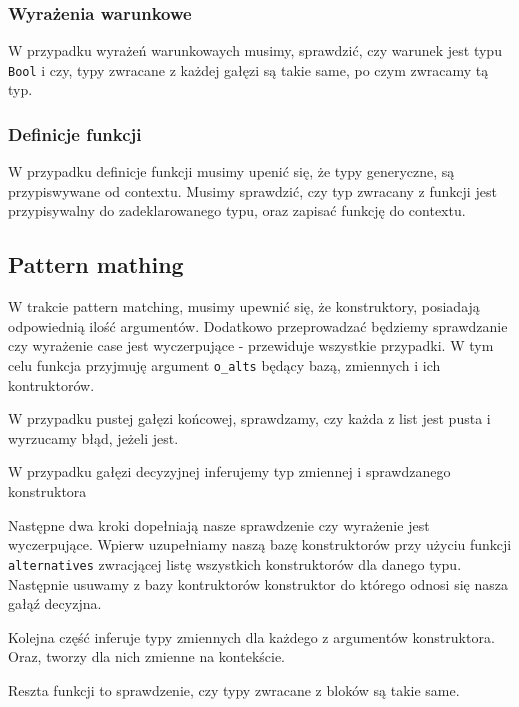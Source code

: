 \documentclass{article}
\begin{document}
\subsubsection{Wyrażenia warunkowe}
W przypadku wyrażeń warunkowaych musimy, sprawdzić, czy warunek jest typu \lstinline{Bool} i czy, typy zwracane z każdej gałęzi są takie same, po czym zwracamy tą typ.


\subsubsection{Definicje funkcji}
W przypadku definicje funkcji musimy upenić się, że typy generyczne, są przypiswywane od contextu. Musimy sprawdzić, czy typ zwracany z funkcji jest przypisywalny do zadeklarowanego typu, oraz zapisać funkcję do contextu.


\subsection{Pattern mathing}
W trakcie pattern matching, musimy upewnić się, że konstruktory, posiadają odpowiednią ilość argumentów. Dodatkowo przeprowadzać będziemy sprawdzanie czy wyrażenie case jest wyczerpujące - przewiduje wszystkie przypadki. W tym celu funkcja przyjmuję argument \lstinline{o_alts} będący bazą, zmiennych i ich kontruktorów.

W przypadku pustej gałęzi końcowej, sprawdzamy, czy każda z list jest pusta i wyrzucamy błąd, jeżeli jest.


W przypadku gałęzi decyzyjnej inferujemy typ zmiennej i sprawdzanego konstruktora

Następne dwa kroki dopełniają nasze sprawdzenie czy wyrażenie jest wyczerpujące. Wpierw uzupełniamy naszą bazę konstruktorów przy użyciu funkcji \lstinline{alternatives} zwracjącej listę wszystkich konstruktorów dla danego typu.
Następnie usuwamy z bazy kontruktorów konstruktor do którego odnosi się nasza gałąź decyzjna.


Kolejna część inferuje typy zmiennych dla każdego z argumentów konstruktora.
Oraz, tworzy dla nich zmienne na kontekście.\newpage

Reszta funkcji to sprawdzenie, czy typy zwracane z bloków są takie same.

\end{document}
